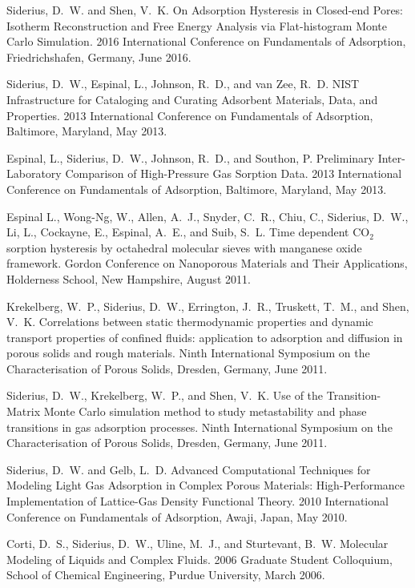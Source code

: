 Siderius, D.~W. and Shen, V.~K. On Adsorption Hysteresis in Closed-end Pores:\\ Isotherm Reconstruction and Free Energy Analysis via Flat-histogram Monte Carlo Simulation. 2016 International Conference on Fundamentals of Adsorption, Friedrichshafen, Germany, June 2016.

Siderius, D.~W., Espinal, L., Johnson, R.~D., and van Zee, R.~D. NIST Infrastructure for Cataloging and Curating Adsorbent Materials, Data, and Properties. 2013 International Conference on Fundamentals of Adsorption, Baltimore, Maryland, May 2013.

Espinal, L., Siderius, D.~W., Johnson, R.~D., and Southon, P. Preliminary Inter-Laboratory Comparison of High-Pressure Gas Sorption Data. 2013 International Conference on Fundamentals of Adsorption, Baltimore, Maryland, May 2013.

Espinal L., Wong-Ng, W., Allen, A.~J., Snyder, C.~R., Chiu, C., Siderius, D.~W., Li, L., Cockayne, E., Espinal, A.~E., and Suib, S.~L. Time dependent CO$_2$ sorption hysteresis by octahedral molecular sieves with manganese oxide framework. Gordon Conference on Nanoporous Materials and Their Applications, Holderness School, New Hampshire, August 2011.

Krekelberg, W.~P., Siderius, D.~W., Errington, J.~R., Truskett, T.~M., and Shen, V.~K. Correlations between static thermodynamic properties and dynamic transport properties of confined fluids: application to adsorption and diffusion in porous solids and rough materials. Ninth International Symposium on the Characterisation of Porous Solids, Dresden, Germany, June 2011.

Siderius, D.~W., Krekelberg, W.~P., and Shen, V.~K. Use of the Transition-Matrix Monte Carlo simulation method to study metastability and phase transitions in gas adsorption processes. Ninth International Symposium on the Characterisation of Porous Solids, Dresden, Germany, June 2011.

Siderius, D.~W. and Gelb, L.~D. Advanced Computational Techniques for Modeling Light Gas Adsorption in Complex Porous Materials: High-Performance Implementation of Lattice-Gas Density Functional Theory. 2010 International Conference on Fundamentals of Adsorption, Awaji, Japan, May 2010.

Corti, D.~S., Siderius, D.~W., Uline, M.~J., and Sturtevant, B.~W. Molecular Modeling of Liquids and Complex Fluids. 2006 Graduate Student Colloquium, School of Chemical Engineering, Purdue University, March 2006.

